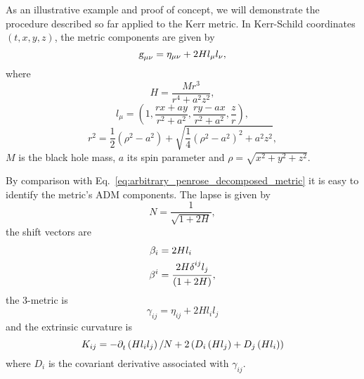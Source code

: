 As an illustrative example and proof of concept, we will demonstrate the procedure described so far applied to the Kerr metric. In Kerr-Schild coordinates $(t,x,y,z)$, the metric components are given by~\cite{PhysRevD.66.084024}
%
\begin{equation}
  \mtrtens{\mu}{\nu} = \eta_{\mu \nu} + 2 H l_\mu l_\nu,
  \label{eq:arbitrary_penrose_kerr_ks_line_element}
\end{equation}
%
where
%
\begin{equation}
  H = \frac{M r^3}{r^4 + a^2 z^2},
  \label{eq:arbitrary_penrose_kerr_ks_H}
\end{equation}
%
\begin{equation}
  l_\mu = \left( 1, \frac{rx + ay}{r^2 + a^2}, \frac{ry - ax}{r^2 + a^2}, \frac{z}{r} \right),
  \label{eq:arbitrary_penrose_kerr_ks_l}
\end{equation}
%
\begin{equation}
  r^2 = \frac{1}{2}\left( \rho^2 - a^2 \right) + \sqrt{\frac{1}{4} \left( \rho^2 - a^2 \right)^2 + a^2z^2},
  \label{eq:arbitrary_penrose_kerr_ks_r}
\end{equation}
%
$M$ is the black hole mass, $a$ its spin parameter and $\rho = \sqrt{x^2 + y^2 + z^2}$.

By comparison with Eq.~\eqref{eq:arbitrary_penrose_decomposed_metric} it is easy to identify the metric's ADM components. The lapse is given by~\cite{PhysRevD.66.084024}
%
\begin{equation}
  N = \frac{1}{\sqrt{1 + 2 H}},
  \label{eq:arbitrary_penrose_kerr_ks_lapse}
\end{equation}
%
the shift vectors are
%
\begin{align}
  \beta_i & = 2 H l_i \label{eq:arbitrary_penrose_kerr_ks_l_shift}                                                      \\
  \beta^i & = \frac{2 H \tens{\delta}{ij}{} l_j }{\left( 1 + 2 H \right)}, \label{eq:arbitrary_penrose_kerr_ks_u_shift}
\end{align}
%
the 3-metric is
%
\begin{equation}
  \gamma_{ij} = \eta_{ij} + 2 H l_i l_j
  \label{eq:arbitrary_penrose_kerr_ks_3_metric}
\end{equation}
%
and the extrinsic curvature is
%
\begin{equation}
  K_{ij} = -\indexdel{t}\left( H l_i l_j \right)/N + 2 \left( D_i \left( H l_j \right) + D_j \left( H l_i \right) \right)
  \label{eq:arbitrary_penrose_kerr_ks_3_extrinsic_curvature}
\end{equation}
%
where $D_i$ is the covariant derivative associated with $\gamma_{ij}$.

